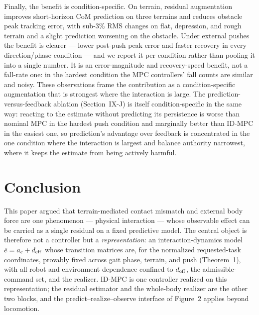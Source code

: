 \documentclass[journal]{IEEEtran}
\theoremstyle{plain}
\theoremstyle{definition}
\theoremstyle{remark}
\newcommand{\deff}{d_{\rm eff}}
\begin{document}
Finally, the benefit is condition-specific. On terrain, residual augmentation improves short-horizon CoM prediction on three terrains and reduces obstacle peak tracking error, with sub-3\% RMS changes on flat, depression, and rough terrain and a slight prediction worsening on the obstacle. Under external pushes the benefit is clearer --- lower post-push peak error and faster recovery in every direction/phase condition --- and we report it per condition rather than pooling it into a single number. It is an error-magnitude and recovery-speed benefit, not a fall-rate one: in the hardest condition the MPC controllers' fall counts are similar and noisy. These observations frame the contribution as a condition-specific augmentation that is strongest where the interaction is large. The prediction-versus-feedback ablation (Section~IX-J) is itself condition-specific in the same way: reacting to the estimate without predicting its persistence is worse than nominal MPC in the hardest push condition and marginally better than ID-MPC in the easiest one, so prediction's advantage over feedback is concentrated in the one condition where the interaction is largest and balance authority narrowest, where it keeps the estimate from being actively harmful.

\section{Conclusion}\label{sec:conclusion}

This paper argued that terrain-mediated contact mismatch and external body force are one phenomenon --- physical interaction --- whose observable effect can be carried as a single residual on a fixed predictive model. The central object is therefore not a controller but a \emph{representation}: an interaction-dynamics model $\ddot e=a_e+\deff$ whose transition matrices are, for the normalized requested-task coordinates, provably fixed across gait phase, terrain, and push (Theorem~1), with all robot and environment dependence confined to $\deff$, the admissible-command set, and the realizer. ID-MPC is one controller realized on this representation; the residual estimator and the whole-body realizer are the other two blocks, and the predict--realize--observe interface of Figure~2 applies beyond locomotion.
\end{document}
